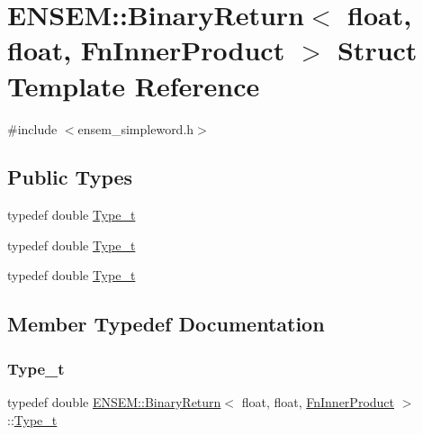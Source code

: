 \hypertarget{structENSEM_1_1BinaryReturn_3_01float_00_01float_00_01FnInnerProduct_01_4}{}\section{E\+N\+S\+EM\+:\+:Binary\+Return$<$ float, float, Fn\+Inner\+Product $>$ Struct Template Reference}
\label{structENSEM_1_1BinaryReturn_3_01float_00_01float_00_01FnInnerProduct_01_4}


{\ttfamily \#include $<$ensem\+\_\+simpleword.\+h$>$}

\subsection*{Public Types}
\begin{DoxyCompactItemize}
\item 
typedef double \mbox{\hyperlink{structENSEM_1_1BinaryReturn_3_01float_00_01float_00_01FnInnerProduct_01_4_a9c257dea59acd1d92cfa3d929aa8ab4b}{Type\+\_\+t}}
\item 
typedef double \mbox{\hyperlink{structENSEM_1_1BinaryReturn_3_01float_00_01float_00_01FnInnerProduct_01_4_a9c257dea59acd1d92cfa3d929aa8ab4b}{Type\+\_\+t}}
\item 
typedef double \mbox{\hyperlink{structENSEM_1_1BinaryReturn_3_01float_00_01float_00_01FnInnerProduct_01_4_a9c257dea59acd1d92cfa3d929aa8ab4b}{Type\+\_\+t}}
\end{DoxyCompactItemize}


\subsection{Member Typedef Documentation}
\mbox{\label{structENSEM_1_1BinaryReturn_3_01float_00_01float_00_01FnInnerProduct_01_4_a9c257dea59acd1d92cfa3d929aa8ab4b}} 
\subsubsection{\texorpdfstring{Type\_t}{Type\_t}\hspace{0.1cm}{\footnotesize\ttfamily [1/3]}}
{\footnotesize\ttfamily typedef double \mbox{\hyperlink{structENSEM_1_1BinaryReturn}{E\+N\+S\+E\+M\+::\+Binary\+Return}}$<$ float, float, \mbox{\hyperlink{structENSEM_1_1FnInnerProduct}{Fn\+Inner\+Product}} $>$\+::\mbox{\hyperlink{structENSEM_1_1BinaryReturn_3_01float_00_01float_00_01FnInnerProduct_01_4_a9c257dea59acd1d92cfa3d929aa8ab4b}{Type\+\_\+t}}}

